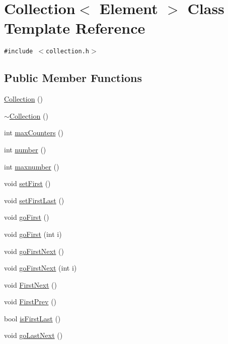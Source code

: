 \hypertarget{classCollection}{
\section{Collection$<$ Element $>$ Class Template Reference}
\label{classCollection}
}
{\tt \#include $<$collection.h$>$}

\subsection*{Public Member Functions}
\begin{CompactItemize}
\item 
\hyperlink{classCollection_12a4fc0e5c8ce642ed3ea13f0fcfaccf}{Collection} ()
\item 
\hyperlink{classCollection_50af9ee71acaf70b0754bbab0f3d9a9a}{$\sim$Collection} ()
\item 
int \hyperlink{classCollection_bb3cb48f763445fa80a5d47f42457fd9}{maxCounters} ()
\item 
int \hyperlink{classCollection_ad4dec45255eaf93f2652c06a7076119}{number} ()
\item 
int \hyperlink{classCollection_5ed56e4ca2e6a9e416628c8996599839}{maxnumber} ()
\item 
void \hyperlink{classCollection_024e58c57f4f773ddf327b730001cf0f}{setFirst} ()
\item 
void \hyperlink{classCollection_12caadbe9b3b41f0ba74b23b6260143f}{setFirstLast} ()
\item 
void \hyperlink{classCollection_2abbefcde25d182a33c95d70a37139f9}{goFirst} ()
\item 
void \hyperlink{classCollection_0ad266a9e0f7ba45615bab587dee740d}{goFirst} (int i)
\item 
void \hyperlink{classCollection_cb98f5d24cd1888894d5e219b6a125b5}{goFirstNext} ()
\item 
void \hyperlink{classCollection_43d729470bb3ede87a0c682ac032cec2}{goFirstNext} (int i)
\item 
void \hyperlink{classCollection_c0f247418e298e0723bccd1f333ba94c}{FirstNext} ()
\item 
void \hyperlink{classCollection_512a3f686fb0676fc9b76750b81cfb6c}{FirstPrev} ()
\item 
bool \hyperlink{classCollection_9680a2f3857625a450cbf6eb75d1af90}{isFirstLast} ()
\item 
void \hyperlink{classCollection_ae18eb14625c9f4742d0c90e437f6035}{goLastNext} ()
\item 

\end{CompactItemize}
